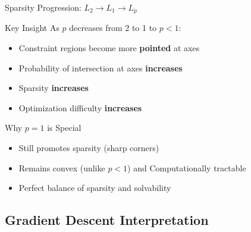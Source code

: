 \documentclass{beamer}
\begin{document}
\begin{frame}{Sparsity Progression: $L_2 \to L_1 \to L_p$}
\footnotesize
\begin{theorembox}{Key Insight}
As $p$ decreases from 2 to 1 to $p < 1$:
\begin{itemize}
\item Constraint regions become more \textbf{pointed} at axes
\item Probability of intersection at axes \textbf{increases}
\item Sparsity \textbf{increases}
\item Optimization difficulty \textbf{increases}
\end{itemize}
\end{theorembox}

\begin{examplebox}{Why $p = 1$ is Special}
\begin{itemize}
\item Still promotes sparsity (sharp corners)
\item Remains convex (unlike $p < 1$) and Computationally tractable
\item Perfect balance of sparsity and solvability
\end{itemize}
\end{examplebox}
\end{frame}

\subsection{Gradient Descent Interpretation}
\end{document}
